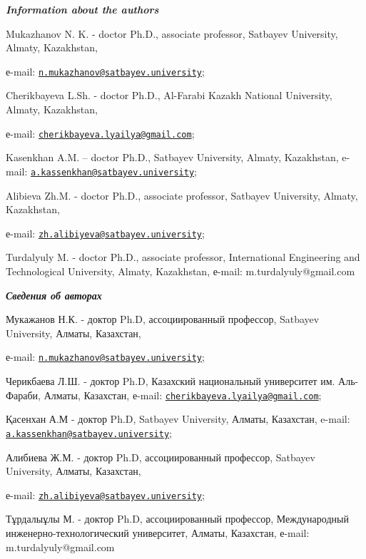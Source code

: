 \begin{authorinfo}
\hspace{1em}\emph{{\bfseries Information about the authors}}

Mukazhanov N. K. - doctor Ph.D., associate professor, Satbayev
University, Almaty, Kazakhstan, 

е-mail:
\href{mailto:n.mukazhanov@satbayev.university}{\nolinkurl{n.mukazhanov@satbayev.university}};

Cherikbayeva L.Sh. - doctor Ph.D., Al-Farabi Kazakh National University,
Almaty, Kazakhstan, 

е-mail:
\href{mailto:cherikbayeva.lyailya@gmail.com}{\nolinkurl{cherikbayeva.lyailya@gmail.com}};

Kasenkhan A.M. -- doctor Ph.D., Satbayev University, Almaty, Kazakhstan,
e-mail:
\href{mailto:a.kassenkhan@satbayev.university}{\nolinkurl{a.kassenkhan@satbayev.university}};

Alibieva Zh.M. - doctor Ph.D., associate professor, Satbayev University,
Almaty, Kazakhstan,

е-mail:
\href{mailto:zh.alibiyeva@satbayev.university}{\nolinkurl{zh.alibiyeva@satbayev.university}};

Turdalyuly M. - doctor Ph.D., associate professor, International
Engineering and Technological University, Almaty, Kazakhstan, е-mail:
m.turdalyuly@gmail.com

\hspace{1em}\emph{{\bfseries Сведения об авторах}}

Мукажанов Н.К. - доктор Ph.D, ассоциированный профессор, Satbayev
University, Алматы, Казахстан, 

е-mail:
\href{mailto:n.mukazhanov@satbayev.university}{\nolinkurl{n.mukazhanov@satbayev.university}};

Черикбаева Л.Ш. - доктор Ph.D, Казахский национальный университет им.
Аль-Фараби, Алматы, Казахстан, е-mail:
\href{mailto:cherikbayeva.lyailya@gmail.com}{\nolinkurl{cherikbayeva.lyailya@gmail.com}};

Қасенхан А.М - доктор Ph.D, Satbayev University, Алматы, Казахстан,
e-mail:
\href{mailto:a.kassenkhan@satbayev.university}{\nolinkurl{a.kassenkhan@satbayev.university}};

Алибиева Ж.М. - доктор Ph.D, ассоциированный профессор, Satbayev
University, Алматы, Казахстан, 

е-mail:
\href{mailto:zh.alibiyeva@satbayev.university}{\nolinkurl{zh.alibiyeva@satbayev.university}};

Тұрдалыұлы М. - доктор Ph.D, ассоциированный профессор, Международный
инженерно-технологический университет, Алматы, Казахстан, е-mail:
m.turdalyuly@gmail.com
\end{authorinfo}
